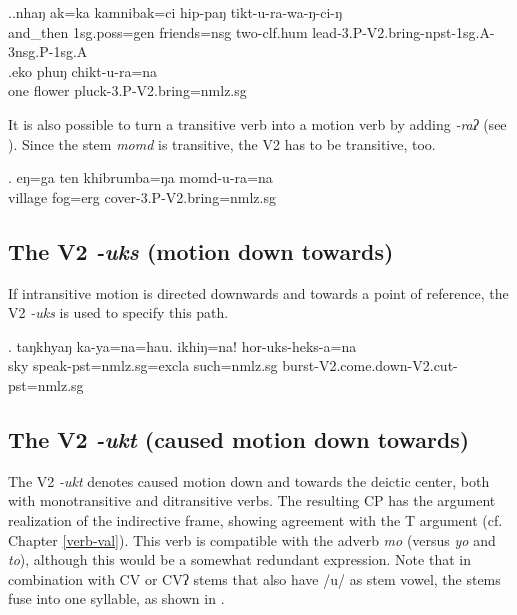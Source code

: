 \ex.\ag.nhaŋ    ak=ka kamnibak=ci hip-paŋ tikt-u-ra-wa-ŋ-ci-ŋ\\
and\_then {\sc 1sg.poss=gen} friends{\sc =nsg} two{\sc -clf.hum} lead{\sc -3.P-V2.bring-npst-1sg.A-3nsg.P-1sg.A}\\
\bg.eko phuŋ chikt-u-ra=na\\
one flower pluck{\sc [3sg.A;pst]-3.P-V2.bring=nmlz.sg}\\


It is also possible to turn a transitive verb into a motion verb by adding \emph{-raʔ} (see \Next). Since the stem \emph{momd}  is transitive, the V2 has to be transitive, too. 

\exg. eŋ=ga ten khibrumba=ŋa momd-u-ra=na\\
 village fog{\sc =erg} cover{\sc [3sg.A;pst]-3.P-V2.bring=nmlz.sg}\\


\subsection{The V2 \emph{-uks} (motion down towards)}\label{V2-comedown}%

If intransitive motion  is directed downwards and towards a point of reference, the V2 \emph{-uks}  is used to specify this path.

\exg. taŋkhyaŋ ka-ya=na=hau. ikhiŋ=na! hor-uks-heks-a=na\\
sky speak{\sc [3sg]-pst=nmlz.sg=excla} such{\sc =nmlz.sg} burst{\sc -V2.come.down-V2.cut-pst=nmlz.sg}\\
 

\subsection{The V2 \emph{-ukt}  (caused motion down towards)}\label{V2-bringdown}%

The V2 \emph{-ukt}  denotes caused motion down and towards the deictic center, both with monotransitive and ditransitive verbs. The resulting CP has the argument realization of the indirective frame, showing agreement with the T argument (cf. Chapter \ref{verb-val}). This verb is compatible with the adverb \emph{mo}  (versus \emph{yo} and \emph{to}), although this would be a somewhat redundant expression. Note that in combination with CV or CVʔ stems that also have /u/ as stem vowel, the stems fuse into one syllable, as shown in \Next[b].

